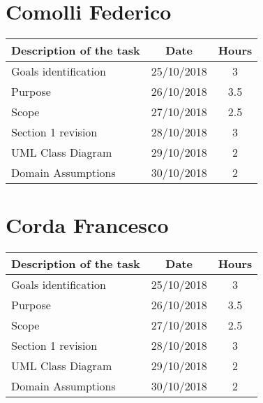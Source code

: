 \section{Comolli Federico}
\begin{center}
\begin{tabular}{l c c}
{\bf Description of the task}&{\bf Date}&{\bf Hours}\\ \hline
Goals identification & {25/10/2018} & {3} \\ \hline
Purpose & {26/10/2018} & {3.5} \\ \hline
Scope & {27/10/2018} & {2.5} \\ \hline
Section 1 revision & {28/10/2018} & {3} \\ \hline
UML Class Diagram & {29/10/2018} & {2} \\ \hline
Domain Assumptions & {30/10/2018} & {2} \\ \hline
\end{tabular}
\end{center}

\section{Corda Francesco}
\begin{center}
\begin{tabular}{l c c}
{\bf Description of the task}&{\bf Date}&{\bf Hours}\\ \hline
Goals identification & {25/10/2018} & {3} \\ \hline
Purpose & {26/10/2018} & {3.5} \\ \hline
Scope & {27/10/2018} & {2.5} \\ \hline
Section 1 revision & {28/10/2018} & {3} \\ \hline
UML Class Diagram & {29/10/2018} & {2} \\ \hline
Domain Assumptions & {30/10/2018} & {2} \\ \hline
\end{tabular}
\end{center}